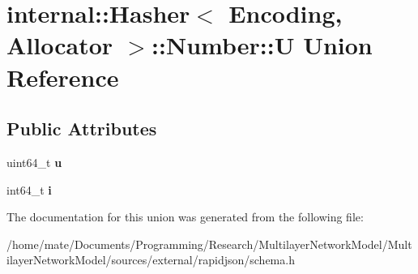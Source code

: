 \hypertarget{unioninternal_1_1Hasher_1_1Number_1_1U}{}\section{internal\+:\+:Hasher$<$ Encoding, Allocator $>$\+:\+:Number\+:\+:U Union Reference}
\label{unioninternal_1_1Hasher_1_1Number_1_1U}
\subsection*{Public Attributes}
\begin{DoxyCompactItemize}
\item 
uint64\+\_\+t {\bfseries u}\hypertarget{unioninternal_1_1Hasher_1_1Number_1_1U_a6380a48b72a4bb5dd7291d47814e6421}{}\label{unioninternal_1_1Hasher_1_1Number_1_1U_a6380a48b72a4bb5dd7291d47814e6421}

\item 
int64\+\_\+t {\bfseries i}\hypertarget{unioninternal_1_1Hasher_1_1Number_1_1U_a19099b91768e67f02ed5a27fc157974b}{}\label{unioninternal_1_1Hasher_1_1Number_1_1U_a19099b91768e67f02ed5a27fc157974b}

\end{DoxyCompactItemize}


The documentation for this union was generated from the following file\+:\begin{DoxyCompactItemize}
\item 
/home/mate/\+Documents/\+Programming/\+Research/\+Multilayer\+Network\+Model/\+Multilayer\+Network\+Model/sources/external/rapidjson/schema.\+h\end{DoxyCompactItemize}
